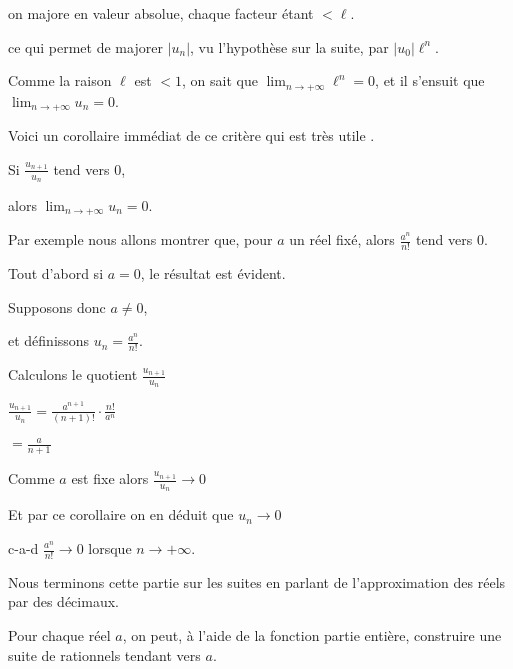 \change

on majore en valeur absolue,  chaque facteur étant $<\ell$.

\change

ce qui permet de majorer $|u_n|$, vu l'hypothèse sur la suite, par $|u_0|\ell^n$.

\change 

Comme la raison $\ell$ est $<1$, on sait que 
$\lim_{n\to +\infty} \ell^n= 0$, et il s'ensuit que $\lim_{n\to +\infty} u_n= 0$.  


\diapo

Voici un corollaire immédiat de ce critère qui est très utile .


Si $\frac{u_{n+1}}{u_n}$ tend vers $0$,

alors $\lim_{n\to +\infty} u_n= 0$.

\change


Par exemple nous allons montrer que, pour $a$ un réel fixé, alors $\frac{a^n}{n!}$ tend vers $0$.

\change

Tout d'abord si $a=0$, le résultat est évident. 

\change

Supposons donc $a\neq 0$,

et définissons $u_n= \frac{a^n}{n!}$. 

\change

Calculons le quotient $\frac{u_{n+1}}{u_n}$

$\frac{u_{n+1}}{u_n}= \frac{a^{n+1}}{(n+1)!}\cdot \frac{n!}{a^n}$

\change

$=\frac{a}{n+1} $

\change

Comme $a$ est fixe alors $\frac{u_{n+1}}{u_n} \to 0$

\change 

Et par ce corollaire on en déduit que $u_n \to 0$

c-a-d  $\frac{a^n}{n!} \to 0$ lorsque $n\to +\infty$.


\diapo

Nous terminons cette partie sur les suites en parlant 
de l'approximation des réels par des décimaux.



Pour chaque réel $a$, on peut, à l'aide de la 
fonction partie entière, construire une suite de rationnels tendant vers $a$.

